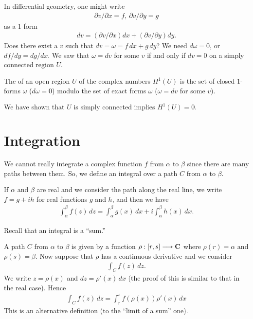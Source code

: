 \documentclass[11pt, oneside,margin=1in]{article}
\begin{document}
In differential geometry, one might write
\begin{align*}
	\partial v /\partial x = f,\ \partial v / \partial y = g
\end{align*}
as a $1$-form 
\begin{align*}
	dv = (\partial v/\partial x)dx +  (\partial v/\partial y) dy.
\end{align*}
Does there exist a $v$ such that $ dv =\omega = f\,dx + g\,dy$? We need $d\omega = 0$, or $df/dy = dg/dx$. We saw that $\omega = dv$ for some $v$ if and only if $dv = 0$ on a simply connected region $U$.

\begin{definition}[ ]\label{}\text{}
The  of an open region $U$  of the complex numbers $H^1(U)$ is the set of closed $1$-forms $\omega$ ($d\omega = 0$) modulo the set of exact forms $\omega$ ($\omega = dv$ for some $v$).
\end{definition}

We have shown that $U$ is simply connected implies $H^1(U)=0$. 
\section{Integration}
We cannot really integrate a complex function $f$ from $\alpha$ to $\beta$ since there are many paths between them. So, we define an integral over a path $C$ from $\alpha$ to $\beta$.

If $\alpha$ and $\beta$ are real and we consider the path along the real line, we write $f = g + ih$ for real functions $g$ and $h$, and then we have
\begin{align*}
	\int_{\alpha}^{\beta} f(z)  \, dz = \int_{\alpha}^{\beta} g(x)  \, dx + i \int_{\alpha}^{\beta} h(x)  \, dx.   
\end{align*}

Recall that an integral is a ``sum.''

A path $C$ from $\alpha$ to $\beta$ is given by a function $\rho :[r,s] \longrightarrow \mathbf C$ where $\rho(r)=\alpha$ and $\rho(s)= \beta$. Now suppose that $\rho$ has a continuous derivative and we consider 
\begin{align*}
	\int_{C}^{} f(z)  \, dz. 
\end{align*}
We write $z=\rho(x)$ and $dz = \rho'(x) \,dx$ (the proof of this is similar to that in the real case). Hence
\begin{align*}
	\int_{C}^{} f(z)  \, dz= \int_{r}^{s} f(\rho(x)) \rho'(x) \, dx  
\end{align*}
This is an alternative definition (to the ``limit of a sum'' one).
\end{document}
